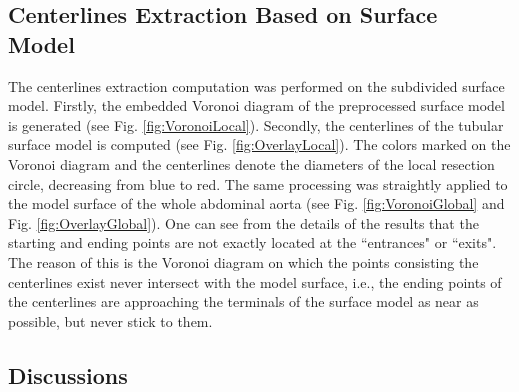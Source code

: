 \subsection{Centerlines Extraction Based on Surface Model}

The centerlines extraction computation was performed on the subdivided surface model.
Firstly, the embedded Voronoi diagram of the preprocessed surface model is generated (see Fig. \ref{fig:VoronoiLocal}).
Secondly, the centerlines of the tubular surface model is computed (see Fig. \ref{fig:OverlayLocal}).
The colors marked on the Voronoi diagram and the centerlines denote the diameters of the local resection circle, decreasing from blue to red.
The same processing was straightly applied to the model surface of the whole abdominal aorta (see Fig. \ref{fig:VoronoiGlobal} and Fig. \ref{fig:OverlayGlobal}).
One can see from the details of the results that the starting and ending points are not exactly located at the ``entrances" or ``exits".
The reason of this is the Voronoi diagram on which the points consisting the centerlines exist never intersect with the model surface, i.e., the ending points of the centerlines are approaching the terminals of the surface model as near as possible, but never stick to them.

\subsection{Discussions}

